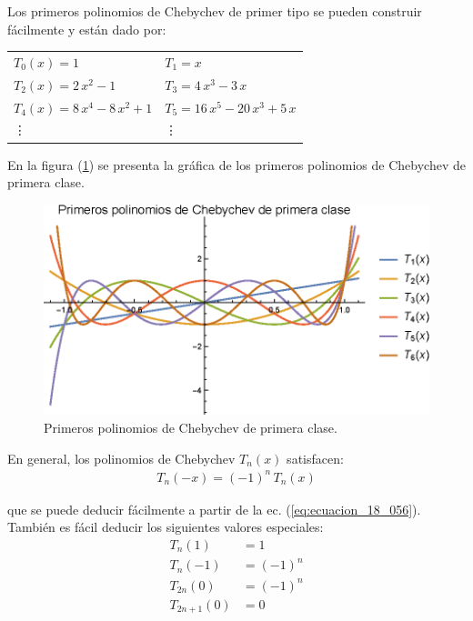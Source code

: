 Los primeros polinomios de Chebychev de primer tipo se pueden construir fácilmente y están dado por:
\begin{table}[H]
\centering
\large
\begin{tabular}{p{6cm} p{6cm}}
$T_{0}(x) = 1$ & $T_{1} = x$ \\[0.5em]
$T_{2}(x) = 2 \, x^{2} - 1$ & $T_{3} = 4 \, x^{3} - 3 \, x$ \\[0.5em]
$T_{4}(x) = 8 \, x^{4} - 8 \, x^{2} + 1$ & $T_{5} = 16 \, x^{5} - 20 \, x^{3} + 5 \, x$ \\[0.5em]
\vdots & \vdots
\end{tabular}
\end{table}

En la figura (\ref{fig:figura_plot_chebychev_01}) se presenta la gráfica de los primeros polinomios de Chebychev de primera clase.
\begin{figure}[H]
    \centering
    \includegraphics[scale=1.3]{Imagenes/Plot_Polinomios_Chebychev_01.eps}
    \caption{Primeros polinomios de Chebychev de primera clase.}
    \label{fig:figura_plot_chebychev_01}
\end{figure}

En general, los polinomios de Chebychev $T_{n}(x)$ satisfacen:
\begin{align*}
T_{n}(-x) = (-1)^{n} \, T_{n} (x)
\end{align*}

que se puede deducir fácilmente a partir de la ec. (\ref{eq:ecuacion_18_056}). También es fácil deducir los siguientes valores especiales:
\begin{align*}
T_{n} (1) &= 1 \\[0.5em]
T_{n} (-1) &= (-1)^{n} \\[0.5em]
T_{2n} (0) &= (-1)^{n} \\[0.5em]
T_{2n+1} (0) &= 0
\end{align*}

